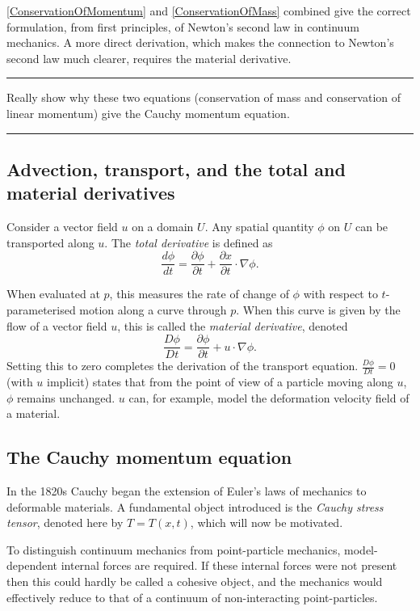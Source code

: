 \documentclass[11pt,a4paper]{memoir}
\newcommand{\todo}[1]{\vskip 0.1in \hrule \vskip 0.03in {#1} \vskip 0.03in \hrule \vskip 0.1in}
\begin{document}
\eqref{ConservationOfMomentum} and \eqref{ConservationOfMass} combined give the correct formulation, from first principles, of Newton's second law in continuum mechanics.
A more direct derivation, which makes the connection to Newton's second law much clearer, requires the material derivative.

\todo{
Really show why these two equations (conservation of mass and conservation of linear momentum) give
the Cauchy momentum equation.
}

\subsection{Advection, transport, and the total and material derivatives} %
Consider a vector field $u$ on a domain $U$. Any spatial quantity $\phi$ on $U$ can be transported along $u$.
The \textit{total derivative} is defined as
    $$\frac{d\phi}{dt} = \frac{\partial \phi}{\partial t} + \frac{\partial x}{\partial t} \cdot \nabla \phi.$$

When evaluated at $p$, this measures the rate of change of $\phi$ with respect to $t$-parameterised motion along a curve through $p$.
When this curve is given by the flow of a vector field $u$, this is called the \textit{material derivative}, denoted
    $$\frac{D\phi}{Dt} = \frac{\partial \phi}{\partial t} + u\cdot \nabla \phi.$$
Setting this to zero completes the derivation of the transport equation. $\frac{D \phi}{Dt} = 0$ (with $u$ implicit) states that from the point of view of
a particle moving along $u$, $\phi$ remains unchanged. $u$ can, for example, model the deformation velocity field of a material.
\subsection{The Cauchy momentum equation} %
In the 1820s Cauchy began the extension of Euler's laws of mechanics to deformable materials.
A fundamental object introduced is the \textit{Cauchy stress tensor}, denoted here by $T = T(x, t)$, which will now be motivated.

To distinguish continuum mechanics from point-particle mechanics, model-dependent internal forces are required. If these internal forces
were not present then this could hardly be called a cohesive object, and the mechanics would effectively reduce to that of a continuum of non-interacting point-particles.
\end{document}
